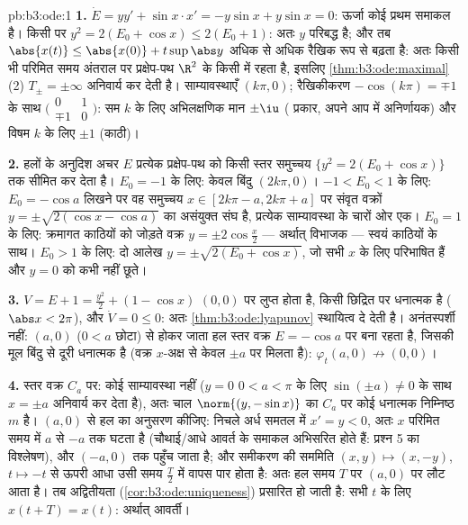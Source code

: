 \begin{solution}{pb:b3:ode:1}
\textbf{1.} $\dot E = yy' + \sin x\cdot x' = -y\sin x +
y\sin x = 0$: ऊर्जा कोई प्रथम समाकल है। किसी  पर $y^2 = 2(E_0 + \cos x) \leq 2(E_0 + 1)$:
अतः $y$ परिबद्ध है; और तब $\abs{x(t)} \leq \abs{x(0)} +
t\sup\abs y$ अधिक से अधिक रैखिक रूप से बढ़ता
है: अतः किसी भी परिमित समय अंतराल पर प्रक्षेप-पथ $\R^2$ के किसी 
में रहता है, इसलिए \cref{thm:b3:ode:maximal}(2) $T_\pm = \pm\infty$ अनिवार्य कर देती है। साम्यावस्थाएँ
$(k\pi, 0)$; रैखिकीकरण $-\cos(k\pi) = \mp1$ के साथ $\bigl(\begin{smallmatrix}0&1\\
\mp1&0\end{smallmatrix}\bigr)$: सम $k$ के लिए अभिलक्षणिक मान
$\pm\iu$ ( प्रकार, अपने आप में अनिर्णायक) और विषम $k$ के लिए
$\pm1$ (काठी)।

\textbf{2.} हलों के अनुदिश अचर $E$ प्रत्येक प्रक्षेप-पथ को किसी
स्तर समुच्चय $\{y^2 = 2(E_0 + \cos x)\}$ तक सीमित कर देता है। $E_0 = -1$ के लिए: केवल बिंदु
$(2k\pi, 0)$। $-1 < E_0 <
1$ के लिए: $E_0 = -\cos a$ लिखने पर वह समुच्चय $x \in
[2k\pi - a, 2k\pi + a]$ पर संवृत वक्रों
$y = \pm\sqrt{2(\cos x - \cos a)}$ का असंयुक्त संघ है, प्रत्येक  साम्यावस्था के चारों ओर
एक। $E_0 = 1$ के लिए: क्रमागत काठियों को जोड़ते वक्र $y = \pm2\cos\frac x2$ --- अर्थात्
विभाजक --- स्वयं काठियों के साथ। $E_0 > 1$ के लिए: दो आलेख $y =
\pm\sqrt{2(E_0 + \cos x)}$, जो सभी
$x$ के लिए परिभाषित हैं और $y = 0$ को कभी नहीं छूते।

\textbf{3.} $V = E + 1 = \frac{y^2}2 + (1 - \cos x)$ $(0,0)$ पर लुप्त होता है, किसी छिद्रित  पर
धनात्मक है ($\abs x < 2\pi$), और $\dot V = 0 \leq 0$: अतः \cref{thm:b3:ode:lyapunov} स्थायित्व दे देती है।
अनंतस्पर्शी नहीं: $(a, 0)$ ($0 < a$ छोटा) से होकर जाता हल स्तर वक्र $E = -\cos a$
पर बना रहता है, जिसकी मूल बिंदु से दूरी धनात्मक है (वक्र $x$-अक्ष
से केवल $\pm a$ पर मिलता है): $\varphi_t(a, 0) \not\to (0,0)$।

\textbf{4.} स्तर वक्र $C_a$ पर: कोई साम्यावस्था नहीं ($y = 0$ $0 < a <
\pi$
के लिए $\sin(\pm a) \neq 0$ के साथ $x = \pm a$ अनिवार्य कर देता है), अतः चाल $\norm{(y, -\sin x)}$ का 
$C_a$ पर कोई धनात्मक निम्निष्ठ $m$ है। $(a, 0)$ से हल का अनुसरण कीजिए:
निचले अर्ध समतल में $x' = y < 0$, अतः $x$ परिमित समय में $a$ से $-a$
तक घटता है (चौथाई/आधे आवर्त के समाकल अभिसरित होते हैं: प्रश्न 5 का
विश्लेषण), और $(-a, 0)$ तक पहुँच जाता है; और समीकरण की सममिति $(x, y) \mapsto (x, -y)$,
$t
\mapsto -t$ से ऊपरी आधा उसी समय $\frac T2$ में वापस पार होता है: अतः हल समय
$T$ पर $(a, 0)$ पर लौट आता है। तब अद्वितीयता (\cref{cor:b3:ode:uniqueness}) प्रसारित हो जाती
है: सभी $t$ के लिए $x(t + T) =
x(t)$: अर्थात् आवर्ती।


\end{solution}
